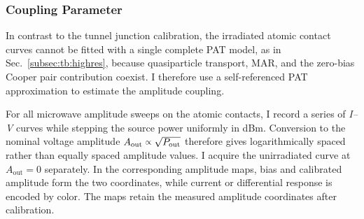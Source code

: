    \subsubsection*{Coupling Parameter}

        In contrast to the tunnel junction calibration, the irradiated atomic contact curves cannot be fitted with a single complete PAT model, as in Sec.~\ref{subsec:tb:highres}, because quasiparticle transport, MAR, and the zero-bias Cooper pair contribution coexist. I therefore use a self-referenced PAT approximation to estimate the amplitude coupling.

        For all microwave amplitude sweeps on the atomic contacts, I record a series of \textit{I--V} curves while stepping the source power uniformly in dBm. Conversion to the nominal voltage amplitude $A_\mathrm{out}\spropto\sqrt{P_\mathrm{out}}$ therefore gives logarithmically spaced rather than equally spaced amplitude values. I acquire the unirradiated curve at $A_\mathrm{out}=0$ separately. In the corresponding amplitude maps, bias and calibrated amplitude form the two coordinates, while current or differential response is encoded by color. The maps retain the measured amplitude coordinates after calibration.

